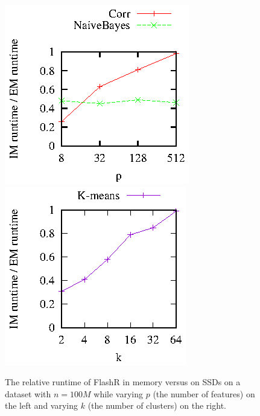 \begin{figure}[t]
	\begin{center}
		\footnotesize
		\includegraphics{FlashMatrix_figs/IM-vs-EM-stat.eps}
		\includegraphics{FlashMatrix_figs/IM-vs-EM-clust.eps}
		\vspace{-10pt}
		\caption{The relative runtime of FlashR in memory versus on SSDs
		on a dataset with $n=100M$ while varying $p$ (the number of features)
		on the left and varying $k$ (the number of clusters) on the right.}
		\label{perf:stat}
	\end{center}
  \vspace{-15pt}
\end{figure}

